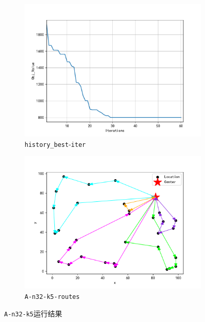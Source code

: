 \documentclass{nudt}
\begin{document}
  \begin{figure}[H]
	\centering
	\begin{subfigure}{0.475\linewidth}
		\centering
		\includegraphics[height=0.85\linewidth]{image/A-n32-k5iter.pdf}
		\caption{\texttt{history\_best}-\texttt{iter}}
		\label{fig:A-n32-k5iter}%
	\end{subfigure}
	\centering
	\begin{subfigure}{0.475\linewidth}
		\centering
		\includegraphics[height=0.85\linewidth]{image/A-n32-k5routes.pdf}
		\caption{\texttt{A-n32-k5-routes}}
		\label{fig:A-n32-k5routes}%
	\end{subfigure}
	\caption{\texttt{A-n32-k5}运行结果}
	\label{fig:A-n32-k5}
\end{figure}
\end{document}
